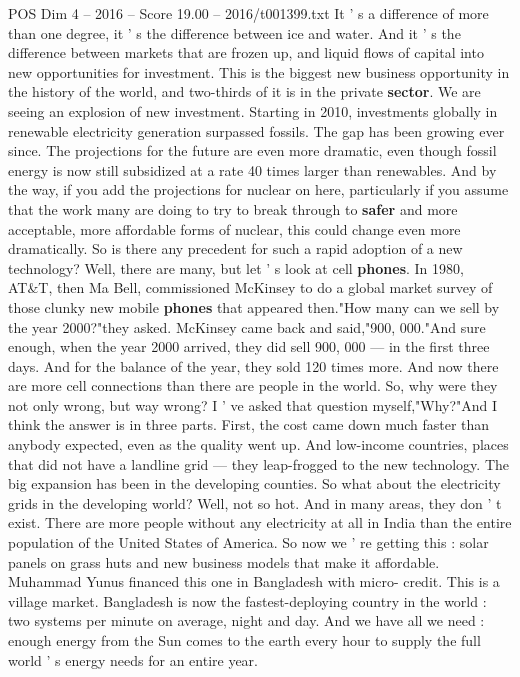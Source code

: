 \begin{textsample}{POS Dim 4 – 2016 – Score 19.00 – 2016/t001399.txt}
It ' s a difference of more than one degree, it ' s the difference between ice and water.
And it ' s the difference between markets that are frozen up, and liquid flows of capital into new opportunities for investment.
This is the biggest new business opportunity in the history of the world, and two-thirds of it is in the private \textbf{sector}.
We are seeing an explosion of new investment.
Starting in 2010, investments globally in renewable electricity generation surpassed fossils.
The gap has been growing ever since.
The projections for the future are even more dramatic, even though fossil energy is now still subsidized at a rate 40 times larger than renewables.
And by the way, if you add the projections for nuclear on here, particularly if you assume that the work many are doing to try to break through to \textbf{safer} and more acceptable, more affordable forms of nuclear, this could change even more dramatically.
So is there any precedent for such a rapid adoption of a new technology?
Well, there are many, but let ' s look at cell \textbf{phones}.
In 1980, AT\&T, then Ma Bell, commissioned McKinsey to do a global market survey of those clunky new mobile \textbf{phones} that appeared then."How many can we sell by the year 2000?"they asked.
McKinsey came back and said,"900, 000."And sure enough, when the year 2000 arrived, they did sell 900, 000 — in the first three days.
And for the balance of the year, they sold 120 times more.
And now there are more cell connections than there are people in the world.
So, why were they not only wrong, but way wrong?
I ' ve asked that question myself,"Why?"And I think the answer is in three parts.
First, the cost came down much faster than anybody expected, even as the quality went up.
And low-income countries, places that did not have a landline grid — they leap-frogged to the new technology.
The big expansion has been in the developing counties.
So what about the electricity grids in the developing world?
Well, not so hot.
And in many areas, they don ' t exist.
There are more people without any electricity at all in India than the entire population of the United States of America.
So now we ' re getting this : solar panels on grass huts and new business models that make it affordable.
Muhammad Yunus financed this one in Bangladesh with micro- credit.
This is a village market.
Bangladesh is now the fastest-deploying country in the world : two systems per minute on average, night and day.
And we have all we need : enough energy from the Sun comes to the earth every hour to supply the full world ' s energy needs for an entire year.

\end{textsample}
